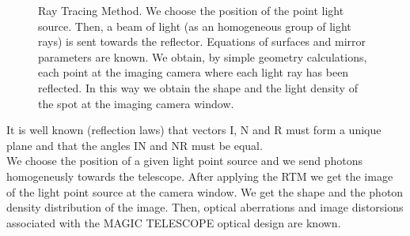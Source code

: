 \begin{figure}[h]\centering
  \leavevmode \epsfxsize=9cm
  \caption{\tiny{Ray Tracing Method. We choose the position of the 
      point light source. Then, a beam of light (as an homogeneous
      group of light rays) is sent towards the reflector. Equations of
      surfaces and mirror parameters are known. We obtain, by simple
      geometry calculations, each point at the imaging camera where
      each light ray has been reflected. In this way we obtain the
      shape and the light density of the spot at the imaging camera
      window.}}
\end{figure}
It is well known (reflection laws) that vectors I, N and R must form a
unique plane and that the angles IN and NR must be equal.\\

We choose the position of a given light point source and we send
photons homogeneusly towards the telescope. After applying the RTM we
get the image of the light point source at the camera window. We get
the shape and the photon density distribution of the image. Then,
optical aberrations and image distorsions associated with the MAGIC
TELESCOPE optical design are known.





